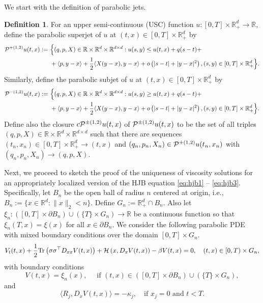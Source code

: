 \documentclass[11pt]{article}
\theoremstyle{definition}
\newtheorem{definition}[assumption]{Definition}
\theoremstyle{plain}
\newcommand{\R}{\mathbb{R}}
\newcommand{\cH}{{\cal H}}
\newcommand{\cP}{{\cal P}}
\begin{document}
\begin{appendices}
We start with the definition of parabolic jets.
\begin{definition}\label{def:jets}
For an upper semi-continuous (USC) function $u : [0,T]\times \R_+^d \to \R$, define the parabolic superjet of $u$ at $(t,x) \in [0,T]\times \R_+^d$ by
\begin{align*}
\cP^{+(1,2)} u(t,x) := &~\Big\{ (q,p,X) \in \R \times \R^d \times \R^{d\times d} : u(s,y) \leq
u(t,x) + q(s-t) + \\
&~ + \langle p, y-x\rangle + \frac{1}{2} \langle X(y-x), y-x \rangle + o\left(|s-t| + |y-x|^2\right), (s,y) \in [0,T]\times \R_+^d\Big\}.
\end{align*}
Similarly, define the parabolic subjet of $u$ at $(t,x) \in [0,T]\times \R_+^d$ by
\begin{align*}
\cP^{-(1,2)} u(t,x) := &~\Big\{ (q,p,X) \in \R \times \R^d \times \R^{d\times d} : u(s,y) \geq
u(t,x) + q(s-t) + \\
&~ + \langle p, y-x\rangle + \frac{1}{2} \langle X(y-x), y-x \rangle + o\left(|s-t| + |y-x|^2\right), (s,y) \in [0,T]\times \R_+^d\Big\}.
\end{align*}
Define also the closure $c\cP^{\pm(1,2)} u(t,x)$ of $\cP^{\pm(1,2)} u(t,x)$ to be the set 
of all triples $(q,p,X) \in \R \times \R^d \times \R^{d\times d}$ such that
there are sequences $(t_n,x_n) \in [0,T]\times \R_+^d \to (t,x)$ 
and $(q_n,p_n,X_n) \in \cP^{\pm(1,2)} u(t_n,x_n)$ with $(q_n,p_n,X_n) \to (q,p,X)$.
\end{definition}
Next, we proceed to sketch the proof of the uniqueness of viscosity solutions for an appropriately localized version of the HJB equation \eqref{eq:hjb1} -- \eqref{eq:hjb3}. 
Specifically, let $B_n$ be the open ball of radius $n$ centered at origin, 
i.e., $B_n := \{x\in\R^d : \|x\|_2 < n\}$. Define $G_n := \R_+^d \cap B_n$. 
Also let $\xi_n : \left([0,T] \times \partial B_n\right)\cup \left(\{T\} \times G_n\right) \to \R$ be a continuous function so that $\xi_n(T,x) = \xi(x)$ for all $x \in \partial B_n$.
We consider the following parabolic PDE with mixed boundary conditions over the domain $[0,T]\times G_n$.
\begin{equation}\label{eq:hjb1-n}
  V_t(t,x) + \frac{1}{2}\mathrm{Tr}\left(\sigma\sigma^{\top} D_{xx}V(t,x)\right) + \cH\left(x, D_x V(t,x)\right) - \beta V(t,x) = 0, 
  \quad (t,x) \in [0,T) \times G_n,
\end{equation}
  with boundary conditions
\begin{equation}\label{eq:hjb2-n}
  V(t,x) = \xi_n(x), \quad \text{ if } (t, x) \in \left([0,T] \times \partial B_n \right) \cup \left(\{T\} \times G_n\right),
\end{equation}
  and 
\begin{equation}\label{eq:hjb3-n}
  \langle R_j, D_x V (t,x) \rangle = -\kappa_j, \quad \text{if } x_j = 0 \text{ and } t<T.
\end{equation}


\end{appendices}
\end{document}
